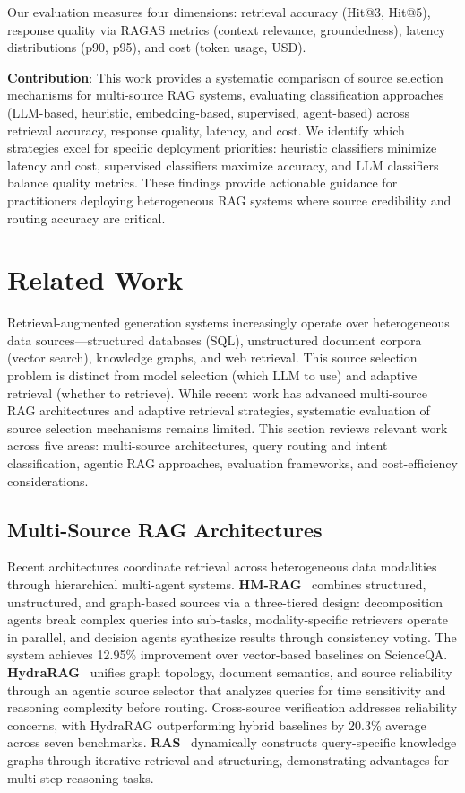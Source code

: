 \documentclass[twocolumn,10pt]{article}
\begin{document}
Our evaluation measures four dimensions: retrieval accuracy (Hit@3, Hit@5), response quality via RAGAS metrics (context relevance, groundedness), latency distributions (p90, p95), and cost (token usage, USD).

\textbf{Contribution}: This work provides a systematic comparison of source selection mechanisms for multi-source RAG systems, evaluating classification approaches (LLM-based, heuristic, embedding-based, supervised, agent-based) across retrieval accuracy, response quality, latency, and cost. We identify which strategies excel for specific deployment priorities: heuristic classifiers minimize latency and cost, supervised classifiers maximize accuracy, and LLM classifiers balance quality metrics. These findings provide actionable guidance for practitioners deploying heterogeneous RAG systems where source credibility and routing accuracy are critical.

\section{Related Work}

Retrieval-augmented generation systems increasingly operate over heterogeneous data sources---structured databases (SQL), unstructured document corpora (vector search), knowledge graphs, and web retrieval. This source selection problem is distinct from model selection (which LLM to use) and adaptive retrieval (whether to retrieve). While recent work has advanced multi-source RAG architectures and adaptive retrieval strategies, systematic evaluation of source selection mechanisms remains limited. This section reviews relevant work across five areas: multi-source architectures, query routing and intent classification, agentic RAG approaches, evaluation frameworks, and cost-efficiency considerations.

\subsection{Multi-Source RAG Architectures}

Recent architectures coordinate retrieval across heterogeneous data modalities through hierarchical multi-agent systems. \textbf{HM-RAG}~\cite{hmrag} combines structured, unstructured, and graph-based sources via a three-tiered design: decomposition agents break complex queries into sub-tasks, modality-specific retrievers operate in parallel, and decision agents synthesize results through consistency voting. The system achieves 12.95\% improvement over vector-based baselines on ScienceQA. \textbf{HydraRAG}~\cite{hydrarag} unifies graph topology, document semantics, and source reliability through an agentic source selector that analyzes queries for time sensitivity and reasoning complexity before routing. Cross-source verification addresses reliability concerns, with HydraRAG outperforming hybrid baselines by 20.3\% average across seven benchmarks. \textbf{RAS}~\cite{ras} dynamically constructs query-specific knowledge graphs through iterative retrieval and structuring, demonstrating advantages for multi-step reasoning tasks.
\end{document}

